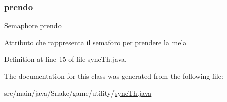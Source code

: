 \mbox{\label{class_snake_1_1game_1_1utility_1_1sync_th_a89d3d89697eb53a38c5b5693c5fb47b4}} 
\subsubsection{\texorpdfstring{prendo}{prendo}}
{\footnotesize\ttfamily Semaphore prendo\hspace{0.3cm}{\ttfamily [private]}}

Attributo che rappresenta il semaforo per prendere la mela 

Definition at line 15 of file sync\+Th.\+java.



The documentation for this class was generated from the following file\+:\begin{DoxyCompactItemize}
\item 
src/main/java/\+Snake/game/utility/\mbox{\hyperlink{sync_th_8java}{sync\+Th.\+java}}\end{DoxyCompactItemize}
